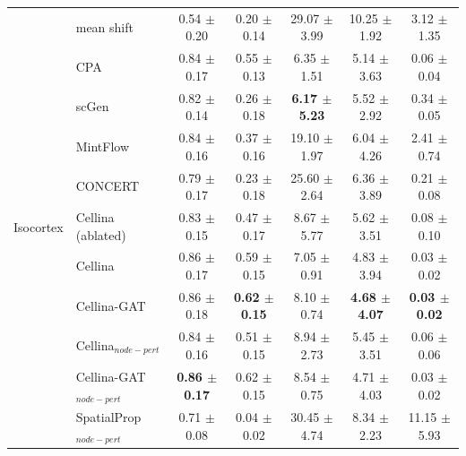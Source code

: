 \begin{table}[t]
\begin{tabular}{llccccc}
\multirow[c]{11}{*}{Isocortex} & mean shift & 0.54 $\pm$ 0.20 & 0.20 $\pm$ 0.14 & 29.07 $\pm$ 3.99 & 10.25 $\pm$ 1.92 & 3.12 $\pm$ 1.35 \\
 & CPA & 0.84 $\pm$ 0.17 & 0.55 $\pm$ 0.13 & 6.35 $\pm$ 1.51 & 5.14 $\pm$ 3.63 & 0.06 $\pm$ 0.04 \\
 & scGen & 0.82 $\pm$ 0.14 & 0.26 $\pm$ 0.18 & \textbf{6.17 $\pm$ 5.23} & 5.52 $\pm$ 2.92 & 0.34 $\pm$ 0.05 \\
 & MintFlow & 0.84 $\pm$ 0.16 & 0.37 $\pm$ 0.16 & 19.10 $\pm$ 1.97 & 6.04 $\pm$ 4.26 & 2.41 $\pm$ 0.74 \\
 & CONCERT & 0.79 $\pm$ 0.17 & 0.23 $\pm$ 0.18 & 25.60 $\pm$ 2.64 & 6.36 $\pm$ 3.89 & 0.21 $\pm$ 0.08 \\
 & Cellina (ablated) & 0.83 $\pm$ 0.15 & 0.47 $\pm$ 0.17 & 8.67 $\pm$ 5.77 & 5.62 $\pm$ 3.51 & 0.08 $\pm$ 0.10 \\
 & Cellina & 0.86 $\pm$ 0.17 & 0.59 $\pm$ 0.15 & 7.05 $\pm$ 0.91 & 4.83 $\pm$ 3.94 & 0.03 $\pm$ 0.02 \\
 & Cellina-GAT & 0.86 $\pm$ 0.18 & \textbf{0.62 $\pm$ 0.15} & 8.10 $\pm$ 0.74 & \textbf{4.68 $\pm$ 4.07} & \textbf{0.03 $\pm$ 0.02} \\
 & Cellina$_{node-pert}$ & 0.84 $\pm$ 0.16 & 0.51 $\pm$ 0.15 & 8.94 $\pm$ 2.73 & 5.45 $\pm$ 3.51 & 0.06 $\pm$ 0.06 \\
 & Cellina-GAT$_{node-pert}$ & \textbf{0.86 $\pm$ 0.17} & 0.62 $\pm$ 0.15 & 8.54 $\pm$ 0.75 & 4.71 $\pm$ 4.03 & 0.03 $\pm$ 0.02 \\
 & SpatialProp$_{node-pert}$ & 0.71 $\pm$ 0.08 & 0.04 $\pm$ 0.02 & 30.45 $\pm$ 4.74 & 8.34 $\pm$ 2.23 & 11.15 $\pm$ 5.93 \\

\bottomrule
\end{tabular}
\end{table}
